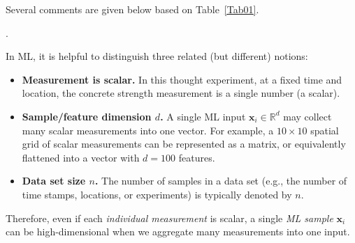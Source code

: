 \documentclass[12pt]{article}
\begin{document}
Several comments are given below based on Table~\ref{Tab01}.

\begin{ex-box}
\noindent {}.

In ML, it is helpful to distinguish three related (but different) notions:
\begin{itemize}
\item \textbf{Measurement is scalar.} In this thought experiment, at a fixed time and location, the concrete strength measurement is a single number (a scalar).
\item \textbf{Sample/feature dimension $d$.} A single ML input $\bm{x}_i \in \mathbb{R}^d$ may collect many scalar measurements into one vector. For example, a $10\times 10$ spatial grid of scalar measurements can be represented as a matrix, or equivalently flattened into a vector with $d=100$ features.
\item \textbf{Data set size $n$.} The number of samples in a data set (e.g., the number of time stamps, locations, or experiments) is typically denoted by $n$.
\end{itemize}

Therefore, even if each \emph{individual measurement} is scalar, a single \emph{ML sample} $\bm{x}_i$ can be high-dimensional when we aggregate many measurements into one input.
\end{ex-box}
\end{document}
